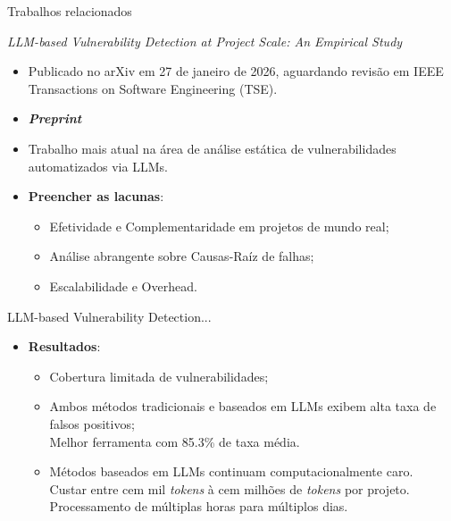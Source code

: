 \documentclass[
    aspectratio=169,   %
    12pt,
    brazil
]{beamer}
\newcommand{\minhaspaginas}{}
\begin{document}
\renewcommand{\minhaspaginas}{\small 41 - 43}
\begin{frame}{Trabalhos relacionados}
  \begin{block}{\textit{LLM-based Vulnerability Detection at Project Scale: An Empirical Study} \cite{li2026llmbased}}
    \begin{itemize}
      \item Publicado no arXiv em 27 de janeiro de 2026, aguardando revisão em IEEE Transactions on Software Engineering (TSE).
      \item \textbf{\textit{Preprint}}
      \item Trabalho mais atual na área de análise estática de vulnerabilidades automatizados via LLMs.
      \item \textbf{Preencher as lacunas}:
        \begin{itemize}
          \item Efetividade e Complementaridade em projetos de mundo real;
          \item Análise abrangente sobre Causas-Raíz de falhas;
          \item Escalabilidade e Overhead.
        \end{itemize}
    \end{itemize}
  \end{block}
\end{frame}

\begin{frame}{LLM-based Vulnerability Detection...}
  \begin{itemize}
    \item \textbf{Resultados}:
      \begin{itemize}
        \item Cobertura limitada de vulnerabilidades; \\
        \item Ambos métodos tradicionais e baseados em LLMs exibem alta taxa de falsos positivos; \\ 
          {\footnotesize Melhor ferramenta com 85.3\% de taxa média.}
        \item Métodos baseados em LLMs continuam computacionalmente caro. \\ 
          {\footnotesize Custar entre cem mil \textit{tokens} à cem milhões de \textit{tokens} por projeto.} \\
          {\footnotesize Processamento de múltiplas horas para múltiplos dias.}
      \end{itemize}
  \end{itemize}
\end{frame}
\end{document}
